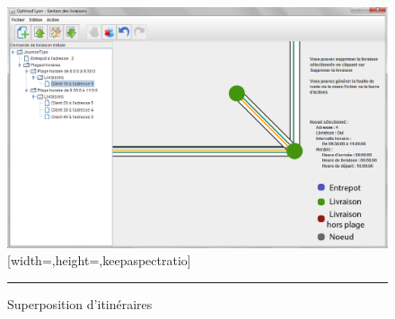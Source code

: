 \begin{figure}[H]
	\centering
		\includegraphics{Figures/path}[width=\textwidth,height=\textheight,keepaspectratio]
		\rule{35em}{0.5pt}
	\caption[Superposition d'itinéraires]{Superposition d'itinéraires}
\end{figure}